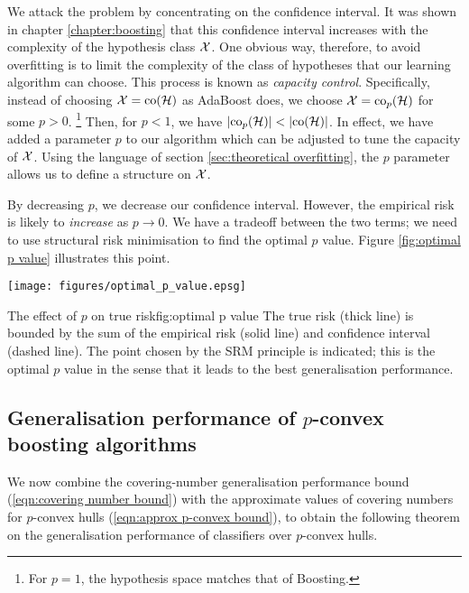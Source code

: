 We attack the problem by concentrating on the confidence interval.
It was shown in chapter \ref{chapter:boosting} that this confidence
interval increases with the complexity of the hypothesis class
$\mathcal{X}$.  One obvious way, therefore, to avoid overfitting is to limit
the complexity of the class of hypotheses that our learning algorithm
can choose.  This process is known as \emph{capacity control}.
Specifically, instead of choosing $\mathcal{X} = \mathrm{co} (\mathcal{H})$ as AdaBoost
does, we choose $\mathcal{X} = \mathrm{co}_p(\mathcal{H})$ for some $p > 0$.%
\footnote{For $p=1$, the hypothesis space matches that of Boosting.}
Then, for $p < 1$, we have $|\mathrm{co}_p (\mathcal{H})| < |\mathrm{co} (\mathcal{H})|$.  In
effect, we have added a parameter $p$ to our algorithm which can be
adjusted to tune the capacity of $\mathcal{X}$.  Using the language of
section \ref{sec:theoretical overfitting}, the $p$ parameter allows us
to define a structure on $\mathcal{X}$.

By decreasing $p$, we decrease our confidence interval.  However, the
empirical risk is likely to \emph{increase} as $p \rightarrow 0$.
We have a tradeoff between the two terms; we need to use structural
risk minimisation to find the optimal $p$ value.  Figure
\ref{fig:optimal p value} illustrates this point.

\begin{linefigure}
\begin{center}
\texttt{[image: figures/optimal\_p\_value.epsg]}
\end{center}
\begin{capt}{The effect of $p$ on true risk}{fig:optimal p value}
The true risk (thick line) is bounded by the sum of the empirical risk
(solid line) and confidence interval (dashed line).  The point chosen
by the SRM principle is indicated; this is the optimal $p$ value in
the sense that it leads to the best generalisation performance.
\end{capt}
\end{linefigure}

\subsection{Generalisation performance of $p$-convex boosting
algorithms}

We now combine the covering-number generalisation performance bound
(\ref{eqn:covering number bound}) with the approximate values of
covering numbers for $p$-convex hulls (\ref{eqn:approx p-convex
bound}), to obtain the following theorem on the generalisation
performance of classifiers over $p$-convex hulls.

